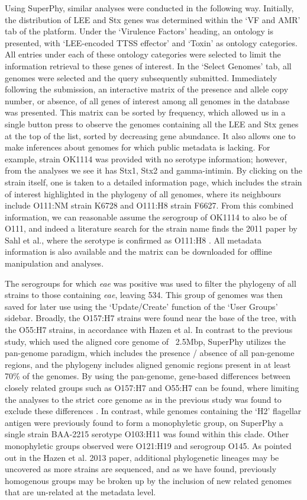 \documentclass[doublespacing, linenumbers]{bmcart}
\begin{document}
Using SuperPhy, similar analyses were conducted in the following way. Initially, the distribution of LEE and Stx genes was determined within the `VF and AMR' tab of the platform. Under the `Virulence Factors' heading,  an ontology is presented, with `LEE-encoded TTSS effector' and `Toxin' as ontology categories. All entries under each of these ontology categories were selected to limit the information retrieval to these genes of interest. In the `Select Genomes' tab, all genomes were selected and the query subsequently submitted. Immediately following the submission, an interactive matrix of the presence and allele copy number, or absence, of all genes of interest among all genomes in the database was presented. This matrix can be sorted by frequency, which allowed us in a single button press to observe the genomes containing all the LEE and Stx genes at the top of the list, sorted by decreasing gene abundance. It also allows one to make inferences about genomes for which public metadata is lacking. For example, strain OK1114 was provided with no serotype information; however, from the analyses we see it has Stx1, Stx2 and gamma-intimin. By clicking on the strain itself, one is taken to a detailed information page, which includes the strain of interest highlighted in the phylogeny of all genomes, where its neighbours include O111:NM strain K6728 and O111:H8 strain F6627. From this combined information, we can reasonable assume the serogroup of OK1114 to also be of O111, and indeed a literature search for the strain name finds the 2011 paper by Sahl et al., where the serotype is confirmed as O111:H8 \cite{sahl_genomic_2011}. All metadata information is also available and the matrix can be downloaded for offline manipulation and analyses. 

The serogroups for which \textit{eae} was positive was used to filter the phylogeny of all strains to those containing \textit{eae}, leaving 534. This group of genomes was then saved for later use using the `Update/Create' function of the `User Groups' sidebar. Broadly, the O157:H7 strains were found near the base of the tree, with the O55:H7 strains, in accordance with Hazen et al. In contrast to the previous study, which used the aligned core genome of ~2.5Mbp, SuperPhy utilizes the pan-genome paradigm, which includes the presence / absence of all pan-genome regions, and the phylogeny includes aligned genomic regions present in at least 70\% of the genomes. By using the pan-genome, gene-based differences between closely related groups such as O157:H7 and O55:H7 can be found, where limiting the analyses to the strict core genome as in the previous study was found to exclude these differences \cite{hazen_refining_2013}. In contrast, while genomes containing the `H2' flagellar antigen were previously found to form a monophyletic group, on SuperPhy a single strain BAA-2215 serotype O103:H11 was found within this clade. Other monophyletic groups observed were O121:H19 and serogroup O145. As pointed out in the Hazen et al. 2013 paper, additional phylogenetic lineages may be uncovered as more strains are sequenced, and as we have found, previously homogenous groups may be broken up by the inclusion of new related genomes that are un-related at the metadata level.
\end{document}
